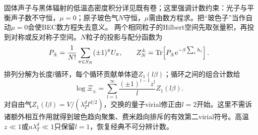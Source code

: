 固体声子与黑体辐射的低温态密度积分详见既有卷；这里强调计数约束：光子与平衡声子数不守恒，$\mu=0$；原子玻色气$N$守恒，$\mu$需由数方程求。把“玻色子”当作自动$\mu=0$会使BEC数方程失去意义。
两个相同粒子的Hilbert空间先取张量积，再投到对称或反对称子空间。$N$粒子的投影与配分函数为
\begin{equation}
P_\pm=\frac1{N!}\sum_{\pi\in S_N}(\pm1)^\pi U_\pi,
\qquad Z_N^\pm=\operatorname{Tr}\!\left[P_\pm\mathrm e^{-\beta\sum_i h_i}\right].
\end{equation}
排列分解为长度$l$循环，每个循环贡献单体迹$Z_1(l\beta)$；循环之间的组合计数给
\begin{equation}
\log\Xi_\pm=\sum_{l=1}^\infty\frac{(\pm1)^{l-1}z^l}{l}Z_1(l\beta).
\end{equation}
对自由气$Z_1(l\beta)=V/(\lambda_T^dl^{d/2})$，交换的量子virial修正由$l=2$开始。这里不需诉诸额外相互作用就得到玻色趋向聚集、费米趋向排斥的有效第二virial符号。高温$z\ll1$或$n\lambda_T^d\ll1$只保留$l=1$，恢复经典不可分辨计数。
